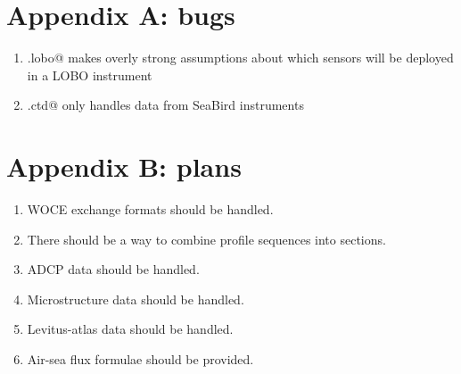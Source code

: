 \documentclass{article}
\begin{document}
\section*{Appendix A: bugs}
\begin{enumerate}

\item \verb@read.lobo@ makes overly strong assumptions about which sensors will be deployed in
a LOBO instrument

\item \verb@read.ctd@ only handles data from SeaBird instruments

\end{enumerate}

\section*{Appendix B: plans}
\begin{enumerate}

\item WOCE exchange formats should be handled.

\item There should be a way to combine profile sequences into sections.

\item ADCP data should be handled.

\item Microstructure data should be handled.

\item Levitus-atlas data should be handled.

\item Air-sea flux formulae should be provided.

\end{enumerate}
\end{document}
